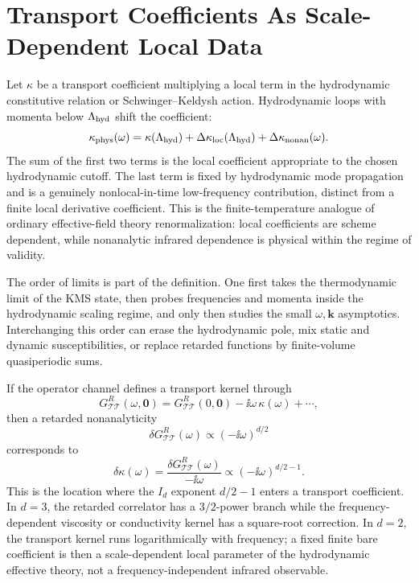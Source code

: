 \section{Transport Coefficients As Scale-Dependent Local Data}

Let \(\kappa\) be a transport coefficient multiplying a local term in the
hydrodynamic constitutive relation or Schwinger--Keldysh action.  Hydrodynamic
loops with momenta below \(\Lambda_{\rm hyd}\) shift the coefficient:
\[
  \kappa_{\rm phys}(\omega)
  =
  \kappa(\Lambda_{\rm hyd})
  +
  \Delta\kappa_{\rm loc}(\Lambda_{\rm hyd})
  +
  \Delta\kappa_{\rm nonan}(\omega).
\]
The sum of the first two terms is the local coefficient appropriate to the
chosen hydrodynamic cutoff.  The last term is fixed by hydrodynamic mode
propagation and is a genuinely nonlocal-in-time low-frequency contribution,
distinct from a finite local derivative coefficient.  This is the
finite-temperature analogue of ordinary effective-field theory
renormalization: local coefficients are scheme dependent, while nonanalytic
infrared dependence is physical within the regime of validity.

The order of limits is part of the definition.  One first takes the
thermodynamic limit of the KMS state, then probes frequencies and momenta
inside the hydrodynamic scaling regime, and only then studies the small
\(\omega,\mathbf k\) asymptotics.  Interchanging this order can erase the
hydrodynamic pole, mix static and dynamic susceptibilities, or replace
retarded functions by finite-volume quasiperiodic sums.

If the operator channel defines a transport kernel through
\[
  G^R_{\mathcal T\mathcal T}(\omega,\mathbf0)
  =
  G^R_{\mathcal T\mathcal T}(0,\mathbf0)
  -\ii\omega\,\kappa(\omega)
  +\cdots ,
\]
then a retarded nonanalyticity
\[
  \delta G^R_{\mathcal T\mathcal T}(\omega)
  \propto
  (-\ii\omega)^{d/2}
\]
corresponds to
\begin{equation}
  \delta\kappa(\omega)
  =
  \frac{\delta G^R_{\mathcal T\mathcal T}(\omega)}{-\ii\omega}
  \propto
  (-\ii\omega)^{d/2-1}.
  \label{eq:hydro-fluct-transport-kernel-exponent}
\end{equation}
This is the location where the \(I_d\) exponent \(d/2-1\) enters a transport
coefficient.  In \(d=3\), the retarded correlator has a \(3/2\)-power branch
while the frequency-dependent viscosity or conductivity kernel has a
square-root correction.  In \(d=2\), the transport kernel runs logarithmically
with frequency; a fixed finite bare coefficient is then a scale-dependent local
parameter of the hydrodynamic effective theory, not a frequency-independent
infrared observable.

